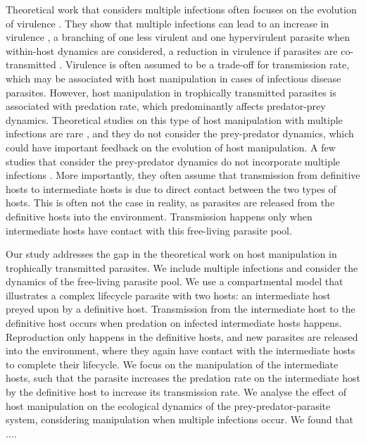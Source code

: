 \documentclass[11pt]{article}
\begin{document}
Theoretical work that considers multiple infections often focuses on the evolution of virulence \cite{vanBaalen1995, Alizon2013, Alizon2008, Choisy2010, Alizon2012}. 
They show that multiple infections can lead to an increase in virulence \cite{vanBaalen1995, Choisy2010}, a branching of one less virulent and one hypervirulent parasite when within-host dynamics are considered, a reduction in virulence if parasites are co-transmitted \cite{Alizon2012}. Virulence is often assumed to be a trade-off for transmission rate, which may be associated with host manipulation in cases of infectious disease parasites. 
However, host manipulation in trophically transmitted parasites is associated with predation rate, which predominantly affects predator-prey dynamics. 
Theoretical studies on this type of host manipulation with multiple infections are rare \cite{Parker2003,Vickery2009}, and they do not consider the prey-predator dynamics, which could have important feedback on the evolution of host manipulation. 
A few studies that consider the prey-predator dynamics do not incorporate multiple infections \cite{Rogawa2018, Iritani2018, Hadeler1989, Fenton2006}. 
More importantly, they often assume that transmission from definitive hosts to intermediate hosts is due to direct contact between the two types of hosts. 
This is often not the case in reality, as parasites are released from the definitive hosts into the environment. 
Transmission happens only when intermediate hosts have contact with this free-living parasite pool.


Our study addresses the gap in the theoretical work on host manipulation in trophically transmitted parasites.
We include multiple infections and consider the dynamics of the free-living parasite pool. 
We use a compartmental model that illustrates a complex lifecycle parasite with two hosts: an intermediate host preyed upon by a definitive host. 
Transmission from the intermediate host to the definitive host occurs when predation on infected intermediate hosts happens. 
Reproduction only happens in the definitive hosts, and new parasites are released into the environment, where they again have contact with the intermediate hosts to complete their lifecycle. 
We focus on the manipulation of the intermediate hosts, such that the parasite increases the predation rate on the intermediate host by the definitive host to increase its transmission rate. 
We analyse the effect of host manipulation on the ecological dynamics of the prey-predator-parasite system, considering manipulation when multiple infections occur. We found that ....
\end{document}
